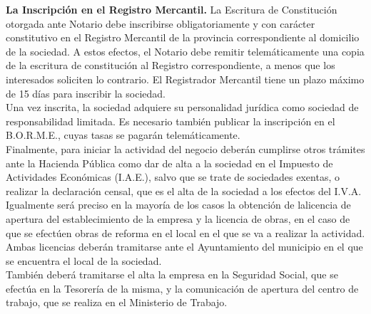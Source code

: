 \textbf{La Inscripción en el Registro Mercantil.}
La Escritura de Constitución otorgada ante Notario debe inscribirse obligatoriamente y con carácter constitutivo en el Registro Mercantil de la provincia correspondiente al domicilio de la sociedad. A estos efectos, el Notario debe remitir telemáticamente una copia de la escritura de constitución al Registro correspondiente, a menos que los interesados soliciten lo contrario. El Registrador Mercantil tiene un plazo máximo de 15 días para inscribir la sociedad.\\

Una vez inscrita, la sociedad adquiere su personalidad jurídica como sociedad de responsabilidad limitada.
Es necesario también publicar la inscripción en el B.O.R.M.E., cuyas tasas se pagarán telemáticamente.\\

Finalmente, para iniciar la actividad del negocio deberán cumplirse otros trámites  ante la Hacienda Pública como dar de alta a la sociedad en el Impuesto de Actividades Económicas (I.A.E.), salvo que se trate de sociedades exentas, o realizar la declaración censal, que es el alta de la sociedad a los efectos del I.V.A.\\

Igualmente será preciso en la mayoría de los casos la obtención de lalicencia de apertura del establecimiento de la empresa y la licencia de obras, en el caso de que se efectúen obras de reforma en el local en el que se va a realizar la actividad. Ambas licencias deberán tramitarse ante el Ayuntamiento del municipio en el que se encuentra el local de la sociedad.\\
También deberá tramitarse el alta la empresa en la Seguridad Social, que se efectúa en la Tesorería de la misma, y la comunicación de apertura del centro de trabajo, que se realiza en el Ministerio de Trabajo.\\


